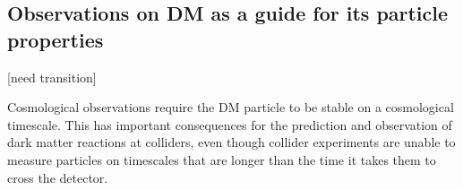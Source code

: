 





\subsection{Observations on DM as a guide for its particle properties}
\label{sec:DMObservations}


[need transition]

Cosmological observations require the DM particle to be stable on a cosmological timescale. This has important consequences for the prediction and observation of dark matter reactions at colliders, even though collider experiments are unable to measure particles on timescales that are longer than the time it takes them to cross the detector. 

\begin{marginnote}[]
\end{marginnote}

